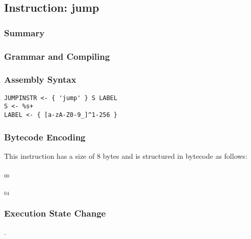 \subsection{Instruction: jump}

\subsubsection{Summary}


\subsubsection{Grammar and Compiling}


\subsubsection{Assembly Syntax}

\begin{myquote}
\begin{verbatim}
JUMPINSTR <- { 'jump' } S LABEL
S <- %s+
LABEL <- { [a-zA-Z0-9_]^1-256 }
\end{verbatim}
\end{myquote}

\subsubsection{Bytecode Encoding}

This instruction has a size of 8 bytes and is structured in bytecode as follows:

$_{00}$\ 



$_{04}$\ 


\subsubsection{Execution State Change}

.


